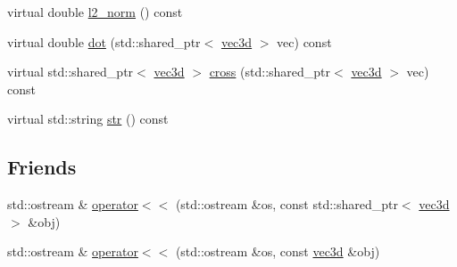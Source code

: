 \begin{DoxyCompactItemize}
\item 
virtual double \hyperlink{classmae_1_1math_1_1vec3d_aef0ce4fe306e9b6ae0dc26cb4ef123bf}{l2\-\_\-norm} () const 
\item 
virtual double \hyperlink{classmae_1_1math_1_1vec3d_a38ae714ef3e525af20c1a31b8c537406}{dot} (std\-::shared\-\_\-ptr$<$ \hyperlink{classmae_1_1math_1_1vec3d}{vec3d} $>$ vec) const 
\item 
virtual std\-::shared\-\_\-ptr$<$ \hyperlink{classmae_1_1math_1_1vec3d}{vec3d} $>$ \hyperlink{classmae_1_1math_1_1vec3d_aac2aed075aefc06722c7304f3d673eba}{cross} (std\-::shared\-\_\-ptr$<$ \hyperlink{classmae_1_1math_1_1vec3d}{vec3d} $>$ vec) const 
\item 
virtual std\-::string \hyperlink{classmae_1_1math_1_1vec3d_a686b7876881d3ffa6c51f9a538998c4a}{str} () const 
\end{DoxyCompactItemize}
\subsection*{Friends}
\begin{DoxyCompactItemize}
\item 
std\-::ostream \& \hyperlink{classmae_1_1math_1_1vec3d_a0639044d670a12dc86ce762c3370c731}{operator$<$$<$} (std\-::ostream \&os, const std\-::shared\-\_\-ptr$<$ \hyperlink{classmae_1_1math_1_1vec3d}{vec3d} $>$ \&obj)
\item 
std\-::ostream \& \hyperlink{classmae_1_1math_1_1vec3d_ab9143424a170891e76f764d1307d48e0}{operator$<$$<$} (std\-::ostream \&os, const \hyperlink{classmae_1_1math_1_1vec3d}{vec3d} \&obj)
\end{DoxyCompactItemize}


